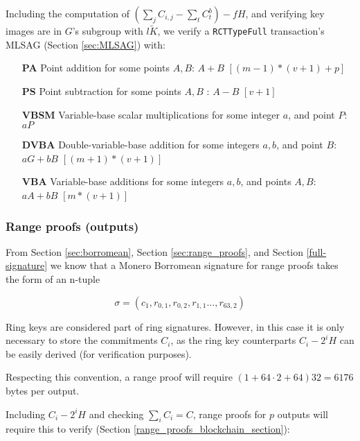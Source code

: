 Including the computation of \((\sum\limits_j C_{i, j} - \sum\limits_t C^b_{t}) - f H\), and verifying key images are in $G$'s subgroup with $l \tilde{K}$, we verify a {\tt RCTTypeFull} transaction's MLSAG (Section \ref{sec:MLSAG}) with:

\begin{itemize}
    \setlength\itemsep{\listspace}
    \item [\textbf{PA}] Point addition for some points $A, B$: $A + B$ \quad \([(m-1)*(v+1) + p]\)%
    \item [\textbf{PS}] Point subtraction for some points $A, B$ : $A - B$ \quad \([v+1]\)%
    \item [\textbf{VBSM}] Variable-base scalar multiplications for some integer $a$, and point $P$: $a P$ \quad [$m$ + 1]%
    \item [\textbf{DVBA}] Double-variable-base addition for some integers $a, b$, and point $B$: $a G + b B$ \quad \([(m+1)*(v+1)]\)%
    \item [\textbf{VBA}] Variable-base additions for some integers $a, b$, and points $A, B$: $a A + b B$ \quad \([m*(v+1)]\)%
\end{itemize}


\subsubsection*{Range proofs (outputs)}
\label{range-proofs-space}

From Section \ref{sec:borromean}, Section \ref{sec:range_proofs}, and Section \ref{full-signature} we know that a Monero Borromean signature for range proofs takes the form of an n-tuple%

\[\sigma = (c_1, r_{0, 1}, r_{0, 2}, r_{1, 1}..., r_{63, 2} )  \]

Ring keys are considered part of ring signatures. However, in this case it is only necessary to store the commitments $C_i$, as the ring key counterparts $C_i - 2^i H$ can be easily derived (for verification purposes). 

Respecting this convention, a range proof will require \( ( 1 + 64 \cdot 2 + 64  ) 32 = 6176\) bytes per output.

Including $C_i - 2^i H$ and checking $\sum_i C_i = C$, range proofs for $p$ outputs will require this to verify (Section \ref{range_proofs_blockchain_section}):

